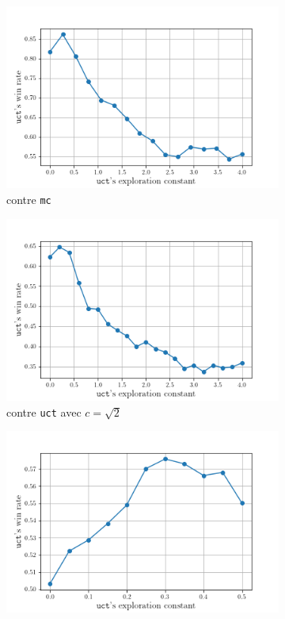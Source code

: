 \documentclass[a4paper]{article}
\theoremstyle{definition}
\begin{document}
\begin{figure}[!h]
	\centering
	\begin{subfigure}{0.49\textwidth}
		\centering
		\includegraphics[width=\textwidth]{test1.png}
		\caption{contre \texttt{mc}}
		\label{fig:1_}
	\end{subfigure}
	\hfill
	\begin{subfigure}{0.49\textwidth}
		\centering
		\includegraphics[width=\textwidth]{test2.png}
		\caption{contre \texttt{uct} avec $c = \sqrt{2}$}
		\label{fig:2_}
	\end{subfigure}
	\hfill
	\begin{subfigure}{0.5\textwidth}
		\centering
		\includegraphics[width=\textwidth]{test3.png}

\end{subfigure}
\end{figure}
\end{document}
